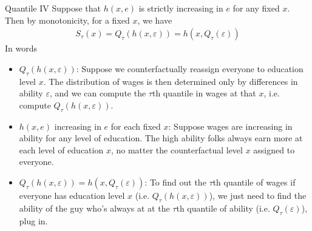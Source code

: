 \documentclass[handout]{beamer}
\begin{document}
\begin{frame}[shrink]{Quantile IV}
Suppose that $h(x,e)$ is strictly increasing in $e$ for any fixed $x$.
Then by monotonicity, for a fixed $x$, we have
\begin{align*}
  S_\tau(x)
  = Q_\tau(h(x,\varepsilon))
  = h(x,Q_\tau(\varepsilon))
\end{align*}
In words
\begin{itemize}
  \item $Q_\tau(h(x,\varepsilon))$:
    Suppose we counterfactually reassign everyone to education level
    $x$. The distribution of wages is then determined only by differences in
    ability $\varepsilon$, and we can compute the $\tau$th quantile in
    wages at that $x$, i.e. compute $Q_\tau(h(x,\varepsilon))$.
  \item
    $h(x,e)$ increasing in $e$ for each fixed $x$:
    Suppose wages are increasing in ability for any level of
    education. The high ability folks always earn more at each level of
    education $x$, no matter the counterfactual level $x$ assigned to
    everyone.
  \item
    $Q_\tau(h(x,\varepsilon)) = h(x,Q_\tau(\varepsilon))$:
    To find out the $\tau$th quantile of wages if everyone has education
    level $x$ (i.e. $Q_\tau(h(x,\varepsilon))$), we just need to find
    the ability of the guy who's always at at the $\tau$th quantile of
    ability (i.e. $Q_\tau(\varepsilon)$), plug in.
\end{itemize}
\end{frame}
\end{document}
